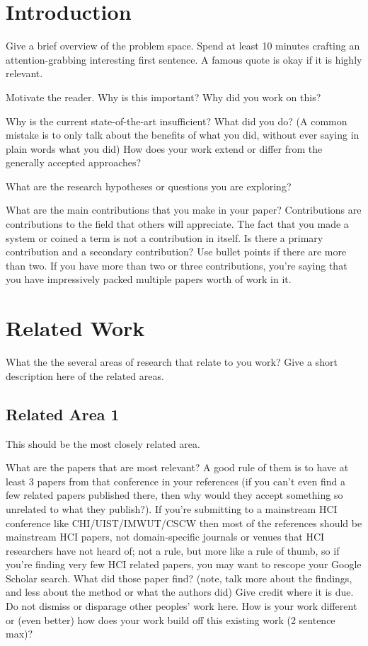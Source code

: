 \documentclass[manuscript,review,anonymous]{acmart}
\begin{document}

\maketitle

\section{Introduction}

Give a brief overview of the problem space.
Spend at least 10 minutes crafting an attention-grabbing interesting first sentence.
A famous quote is okay if it is highly relevant.

Motivate the reader.
Why is this important?
Why did you work on this?

Why is the current state-of-the-art insufficient?
What did you do? (A common mistake is to only talk about the benefits of what you did, without ever saying in plain words what you did)
How does your work extend or differ from the generally accepted approaches?

What are the research hypotheses or questions you are exploring?

What are the main contributions that you make in your paper?
Contributions are contributions to the field that others will appreciate.
The fact that you made a system or coined a term is not a contribution in itself.
Is there a primary contribution and a secondary contribution?
Use bullet points if there are more than two.
If you have more than two or three contributions, you're saying that you have impressively packed multiple papers worth of work in it.

\section{Related Work}
What the the several areas of research that relate to you work?
Give a short description here of the related areas.

\subsection{Related Area 1}
This should be the most closely related area.

What are the papers that are most relevant? A good rule of them is to have at least 3 papers from that conference in your references (if you can't even find a few related papers published there, then why would they accept something so unrelated to what they publish?). If you're submitting to a mainstream HCI conference like CHI/UIST/IMWUT/CSCW then most of the references should be mainstream HCI papers, not domain-specific journals or venues that HCI researchers have not heard of; not a rule, but more like a rule of thumb, so if you're finding very few HCI related papers, you may want to rescope your Google Scholar search.
What did those paper find? (note, talk more about the findings, and less about the method or what the authors did)
Give credit where it is due.
Do not dismiss or disparage other peoples' work here.
How is your work different or (even better) how does your work build off this existing work (2 sentence max)?
\end{document}
